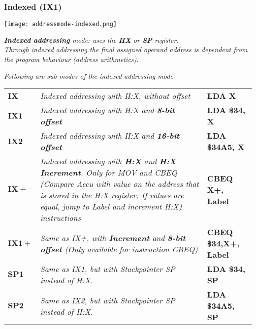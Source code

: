 \subsubsection{Indexed (IX1)}

\texttt{[image: addressmode-indexed.png]}

\textit{
    \textbf{Indexed addressing} mode: uses the \textbf{HX} or \textbf{SP} register. \\
    Through indexed addressing the final assigned operand address is dependent from
    the program behaviour (address arithmetics).
}

\textit{Following are sub modes of the indexed addressing mode}

\begin{tabular}{lp{}l}
    $\mathbf{IX}$   & \textit{Indexed addressing with H:X, without offset}
                    & \scriptsize{\textbf{LDA  X}} \\
    $\mathbf{IX1}$  & \textit{Indexed addressing with H:X and \textbf{8-bit offset}}
                    & \scriptsize{\textbf{LDA  \$34, X}} \\
    $\mathbf{IX2}$  & \textit{Indexed addressing with H:X and \textbf{16-bit offset}}
                    & \scriptsize{\textbf{LDA  \$34A5, X}} \\
    $\mathbf{IX+}$  & \textit{
                            Indexed addressing with \textbf{H:X} and \textbf{H:X
                            Increment}. Only for MOV and CBEQ
                            (Compare Accu with value on the address that
                            is stored in the H:X register. If values are
                            equal, jump to Label and increment H:X)
                            instructions
                        }
                    & \scriptsize{\textbf{CBEQ  X+, Label}} \\
    $\mathbf{IX1+}$ & \textit{Same as IX+, with \textbf{Increment} and \textbf{8-bit offset} (Only available for instruction CBEQ)}
                    & \scriptsize{\textbf{CBEQ  \$34,X+, Label}} \\
    $\mathbf{SP1}$  & \textit{Same as IX1, but with Stackpointer SP instead of H:X.}
                    & \scriptsize{\textbf{LDA  \$34, SP}} \\
    $\mathbf{SP2}$  & \textit{Same as IX2, but with Stackpointer SP instead of H:X.}
                    & \scriptsize{\textbf{LDA  \$34A5, SP}} \\
\end{tabular}

